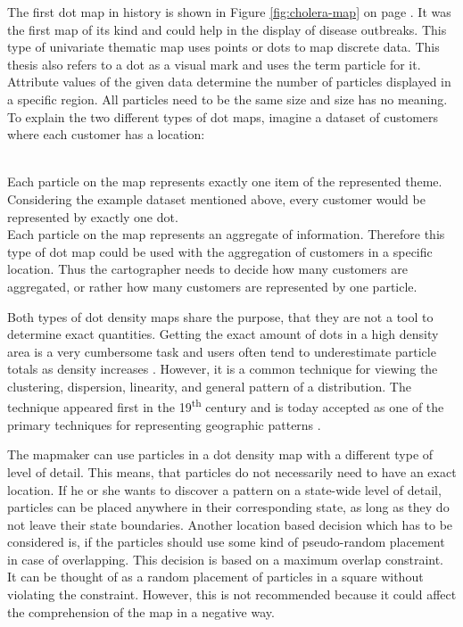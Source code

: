 The first dot map in history is shown in Figure \ref{fig:cholera-map} on page \pageref{fig:cholera-map}. It was the first map of its kind and could help in the display of disease outbreaks. This type of univariate thematic map uses points or dots to map discrete data. This thesis also refers to a dot as a visual mark and uses the term particle for it. Attribute values of the given data determine the number of particles displayed in a specific region. All particles need to be the same size and size has no meaning. To explain the two different types of dot maps, imagine a dataset of customers where each customer has a location:

\begin{enumerate}
 \hfill \\
Each particle on the map represents exactly one item of the represented theme. Considering the example dataset mentioned above, every customer would be represented by exactly one dot.
 \hfill \\
Each particle on the map represents an aggregate of information. Therefore this type of dot map could be used with the aggregation of customers in a specific location. Thus the cartographer needs to decide how many customers are aggregated, or rather how many customers are represented by one particle.
\end{enumerate}

Both types of dot density maps share the purpose, that they are not a tool to determine exact quantities. Getting the exact amount of dots in a high density area is a very cumbersome task and users often tend to underestimate particle totals as density increases . However, it is a common technique for viewing the clustering, dispersion, linearity, and general pattern of a distribution. The technique appeared first in the 19\textsuperscript{th} century and is today accepted as one of the primary techniques for representing geographic patterns .

The mapmaker can use particles in a dot density map with a different type of level of detail. This means, that particles do not necessarily need to have an exact location. If he or she wants to discover a pattern on a state-wide level of detail, particles can be placed anywhere in their corresponding state, as long as they do not leave their state boundaries.
Another location based decision which has to be considered is, if the particles should use some kind of pseudo-random placement in case of overlapping. This decision is based on a maximum overlap constraint. It can be thought of as a random placement of particles in a square without violating the constraint. However, this is not recommended because it could affect the comprehension of the map in a negative way.


